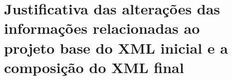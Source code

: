  
\section{Justificativa das alterações das informações relacionadas ao projeto
base do XML inicial e a composição do XML final}

 

\standardchapterstyle



\fancychapterstyle